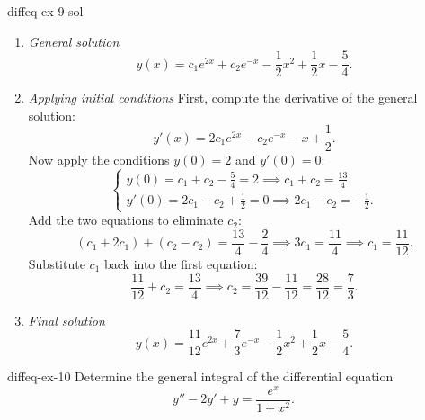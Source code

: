 \documentclass[preview]{standalone}
\begin{document}
\begin{snippetsolution}{diffeq-ex-9-sol}{}
\begin{enumerate}
        \item \emph{General solution}
        \[ y(x) = c_1 e^{2x} + c_2 e^{-x} - \frac{1}{2}x^2 + \frac{1}{2}x - \frac{5}{4}. \]

        \item \emph{Applying initial conditions}
        First, compute the derivative of the general solution:
        \[ y'(x) = 2c_1 e^{2x} - c_2 e^{-x} - x + \frac{1}{2}. \]
        Now apply the conditions \( y(0) = 2 \) and \( y'(0) = 0 \):
        \[
        \begin{cases}
            y(0) = c_1 + c_2 - \frac{5}{4} = 2 \implies c_1 + c_2 = \frac{13}{4} \\
            y'(0) = 2c_1 - c_2 + \frac{1}{2} = 0 \implies 2c_1 - c_2 = -\frac{1}{2}.
        \end{cases}
        \]
        Add the two equations to eliminate \( c_2 \):
        \[ (c_1 + 2c_1) + (c_2 - c_2) = \frac{13}{4} - \frac{2}{4} \implies 3c_1 = \frac{11}{4} \implies c_1 = \frac{11}{12}. \]
        Substitute \( c_1 \) back into the first equation:
        \[ \frac{11}{12} + c_2 = \frac{13}{4} \implies c_2 = \frac{39}{12} - \frac{11}{12} = \frac{28}{12} = \frac{7}{3}. \]

        \item \emph{Final solution}
        \[ y(x) = \frac{11}{12}e^{2x} + \frac{7}{3}e^{-x} - \frac{1}{2}x^2 + \frac{1}{2}x - \frac{5}{4}. \]
    \end{enumerate}
\end{snippetsolution}

\begin{snippetexercise}{diffeq-ex-10}{}
    Determine the general integral of the differential equation
    \[ y'' - 2y' + y = \frac{e^x}{1+x^2}. \]
\end{snippetexercise}
\end{document}
